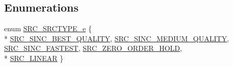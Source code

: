 \subsection*{Enumerations}
\begin{DoxyCompactItemize}
\item 
enum \hyperlink{soxr-lsr_8h_ab042a3bce208c4675a8b6f821eae6447}{S\+R\+C\+\_\+\+S\+R\+C\+T\+Y\+P\+E\+\_\+e} \{ \\*
\hyperlink{soxr-lsr_8h_ab042a3bce208c4675a8b6f821eae6447a5390586814f84b16467093ce2eb2cfd0}{S\+R\+C\+\_\+\+S\+I\+N\+C\+\_\+\+B\+E\+S\+T\+\_\+\+Q\+U\+A\+L\+I\+TY}, 
\hyperlink{soxr-lsr_8h_ab042a3bce208c4675a8b6f821eae6447ad90511870142e65ce4aba49f3ae21878}{S\+R\+C\+\_\+\+S\+I\+N\+C\+\_\+\+M\+E\+D\+I\+U\+M\+\_\+\+Q\+U\+A\+L\+I\+TY}, 
\hyperlink{soxr-lsr_8h_ab042a3bce208c4675a8b6f821eae6447aa85c27f5f94b6e59e46c0a0ab76b1232}{S\+R\+C\+\_\+\+S\+I\+N\+C\+\_\+\+F\+A\+S\+T\+E\+ST}, 
\hyperlink{soxr-lsr_8h_ab042a3bce208c4675a8b6f821eae6447a945bd2a06a1668bc657e5a0284dd6082}{S\+R\+C\+\_\+\+Z\+E\+R\+O\+\_\+\+O\+R\+D\+E\+R\+\_\+\+H\+O\+LD}, 
\\*
\hyperlink{soxr-lsr_8h_ab042a3bce208c4675a8b6f821eae6447a2eb7c16805bc87c82a7e94ed50a3509a}{S\+R\+C\+\_\+\+L\+I\+N\+E\+AR}
 \}
\end{DoxyCompactItemize}
